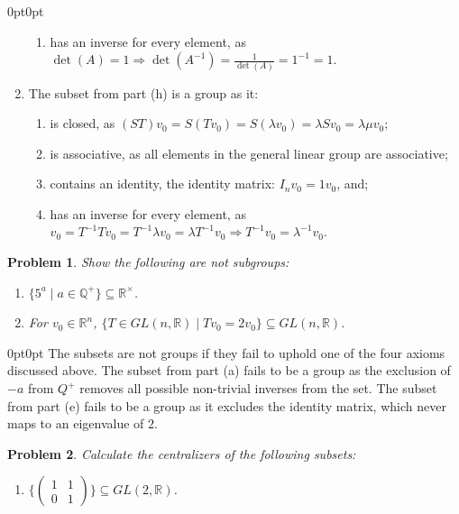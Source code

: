 \documentclass[12pt]{article}
\newtheorem{problem}{Problem}
\numberwithin{problem}{section} %
\theoremstyle{remark}  %
\newenvironment{answer}
    {\begin{adjustwidth}{0pt}{0pt}}
    {\end{adjustwidth}}
\begin{document}
\begin{answer}
\begin{enumerate}[label=(\alph*)]
\begin{enumerate}[label=(\roman*)]
                \item has an inverse for every element, as $\det(A) = 1 \Rightarrow \det(A^{-1}) = \frac{1}{\det(A)} = 1^{-1} = 1$.
            \end{enumerate}
            \item The subset from part (h) is a group as it:
            \begin{enumerate}[label=(\roman*)]
                \item is closed, as $(ST)v_0 = S(Tv_0) = S(\lambda v_0) = \lambda Sv_0 = \lambda\mu v_0$;
                \item is associative, as all elements in the general linear group are associative;
                \item contains an identity, the identity matrix: $I_nv_0 = 1v_0$, and;
                \item has an inverse for every element, as $v_0=T^{-1}Tv_0=T^{-1}\lambda v_0 = \lambda T^{-1}v_0 \Rightarrow T^{-1}v_0=\lambda^{-1}v_0$.
            \end{enumerate}
        \end{enumerate}
    \end{answer}
    \begin{problem}
        Show the following are not subgroups:
        \begin{enumerate}[label=(\alph*)]
            \item $\{5^a \mid a \in \mathbb{Q}^+\} \subseteq \mathbb{R}^\times$.
            \setcounter{enumi}{4}
            \item For $v_0\in \mathbb{R}^n$, $\{T \in GL(n,\mathbb{R}) \mid Tv_0=2v_0\} \subseteq GL(n,\mathbb{R})$.
        \end{enumerate}
    \end{problem}
    \begin{answer}
        The subsets are not groups if they fail to uphold one of the four axioms discussed above. The subset from part (a) fails to be a group as the exclusion of $-a$ from $Q^{+}$ removes all possible non-trivial inverses from the set. The subset from part (e) fails to be a group as it excludes the identity matrix, which never maps to an eigenvalue of $2$.
    \end{answer}
    \begin{problem}
        Calculate the centralizers of the following subsets:
        \begin{enumerate}[label=(\alph*)]
            \item $\{\begin{pmatrix}
                1 & 1 \\
                0 & 1
            \end{pmatrix}\} \subseteq GL(2,\mathbb{R})$.
        \end{enumerate}
    \end{problem}
\end{document}
